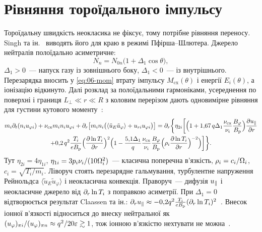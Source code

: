 \section{Рівняння тороїдального імпульсу}\label{sec:06-tor}

Тороїдальну швидкість неокласика не фіксує, тому потрібне рівняння переносу. Singh та ін.~\cite{Singh2004} виводять його для краю в режимі Пфірша--Шлютера. Джерело нейтралів полоїдально асиметричне:
\begin{equation}\label{eq:06-neutrals}
  N_n=N_{0n}\bigl(1+\Delta_1\cos\theta\bigr),
\end{equation}
$\Delta_1>0$~--- напуск газу із зовнішнього боку, $\Delta_1<0$~--- із внутрішнього. Перезарядка вносить у \eqref{eq:06-mom} втрату імпульсу $M_{\mathrm{cx}}(\theta)$ і енергії $E_i(\theta)$, а іонізацію відкинуто. Далі розклад за полоїдальними гармоніками, усереднення по поверхні і границя $L_\perp\ll r\ll R$ з коловим перерізом дають одновимірне рівняння для густини кутового моменту~\cite[рівн.~45]{Singh2004}:
\begin{multline}\label{eq:06-singh}
  m_i\partial_t(n_iu_{\varphi i})+\nu_{\mathrm{cx}}m_in_iu_{\varphi i}+\partial_r\bigl[m_in_i\bigl(\langle\tilde u_E\tilde u_{\varphi}\rangle+u_{ri}u_{\varphi i}\bigr)\bigr]
  =\partial_r\biggl\{\eta_{2i}\biggl[\Bigl(1+1{,}67\,q\Delta_1\frac{\nu_{\mathrm{cx}}}{\nu_i}\frac{B_{\varphi}}{B_{\mathrm{p}}}\Bigr)\frac{\partial u_{\parallel}}{\partial r}\\
  +0{,}2\,q^2\frac{T_i}{eB_{\mathrm{p}}}\Bigl(\frac{\partial\ln T_i}{\partial r}\Bigr)^{2}
  \Bigl(1-\frac{5{,}1\Delta_1}{q}\frac{\nu_{\mathrm{cx}}}{\nu_i}\frac{B_{\varphi}}{B_{\mathrm{p}}}\Bigl(\rho_i\frac{\partial\ln T_i}{\partial r}\Bigr)^{-2}\Bigr)\biggr]\biggr\}.
\end{multline}
Тут $\eta_{2i}=4\eta_{1i}$, $\eta_{1i}=3p_i\nu_i/(10\Omega_{i}^2)$~--- класична поперечна в'язкість, $\rho_i=c_i/\Omega_{i}$, $c_i=\sqrt{T_i/m_i}$. Ліворуч стоять перезарядне гальмування, турбулентне напруження Рейнольдса $\langle\tilde u_E\tilde u_\varphi\rangle$ і неокласична конвекція. Праворуч~--- дифузія $u_{\parallel}$ і неокласичне джерело від $\partial_r\ln T_i$ з поправкою асиметрії. При $\Delta_1=0$ відтворюється результат Claassen та ін.: $\partial_ru_{\parallel}\approx-0{,}2q^2\frac{T_i}{eB_{\mathrm{p}}}(\partial_r\ln T_i)^2$~\cite[рівн.~3, 47]{Singh2004}. Внесок іонної в'язкості відноситься до внеску нейтральної як $(u_{\varphi})_{\pi i}/(u_{\varphi})_{\pi n}\approx q^2/20\varepsilon\gtrsim1$, тож іонною в'язкістю нехтувати не можна~\cite[с.~2]{Singh2004}.

